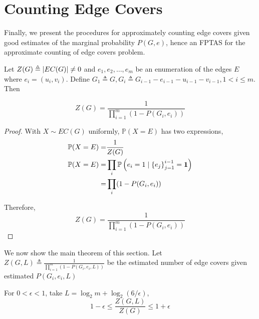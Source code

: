 \section{Counting Edge Covers}

Finally, we present the procedures for approximately counting edge covers given good estimates of the marginal probability $P(G,e)$, hence an FPTAS for the approximate counting of edge covers problem.

\begin{proposition}

    Let $Z(G) \triangleq \left\vert EC(G)\right\vert \neq 0$ and $e_1,e_2,\ldots,e_m$ be an enumeration of the edges $E$ where $e_i = (u_i, v_i)$. Define $G_1 \triangleq G, G_i \triangleq G_{i-1} - e_{i-1} - u_{i-1} - v_{i-1}, 1 < i \leq m $. Then

	\[ Z(G) = \frac{1}{\prod_{i=1}^m (1 - P(G_i, e_i))} \]

\end{proposition}

\begin{proof}

    With $X \sim EC(G)$ uniformly, $\mathbb{P}(X=E)$ has two expressions,
	\begin{align*}
		\mathbb{P} (X = E) =& \frac{1}{Z(G)} \\
		\mathbb{P} (X = E) =& \prod_i \mathbb{P} \left(e_i = 1 \mid \left\{e_j\right\}_{j=1}^{i-1} = \mathbf{1} \right) \\
		=&\prod_i (1- P(G_i, e_i))
	\end{align*}

	Therefore, %
	\[ Z(G) = \frac{1}{\prod_{i=1}^m (1 - P(G_i, e_i))} \]
\end{proof}

We now show the main theorem of this section.
Let $Z(G, L) \triangleq \frac{1}{\prod_{i=1}^m (1 - P(G_i, e_i, L))}$ be the estimated number of edge covers given estimated $P(G_i, e_i, L)$

\begin{theorem}
	For $0< \epsilon <1$, take $L=\log_2 m + \log_2(6/ \epsilon) $,
	\[ 1- \epsilon \leq \frac{Z(G, L)}{Z(G)} \leq 1+ \epsilon\]
\end{theorem}

